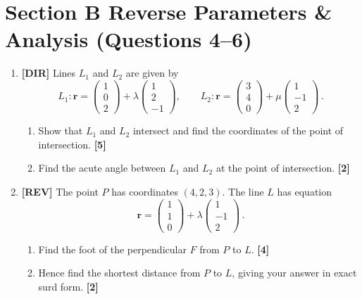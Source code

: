 \documentclass[11pt,a4paper]{article}
\begin{document}
\section*{Section B \quad Reverse Parameters \& Analysis \hfill{\normalfont\small(Questions 4--6)}}
\begin{enumerate}[resume]
\item \textbf{[DIR]} Lines $L_1$ and $L_2$ are given by
\[
L_1 : \mathbf{r} = \begin{pmatrix} 1 \\ 0 \\ 2 \end{pmatrix} + \lambda\begin{pmatrix} 1 \\ 2 \\ -1 \end{pmatrix},
\qquad
L_2 : \mathbf{r} = \begin{pmatrix} 3 \\ 4 \\ 0 \end{pmatrix} + \mu\begin{pmatrix} 1 \\ -1 \\ 2 \end{pmatrix}\,.
\]
\begin{enumerate}
  \item Show that $L_1$ and $L_2$ intersect and find the coordinates of the point of intersection. \hfill{\small\textbf{[5]}}
  \item Find the acute angle between $L_1$ and $L_2$ at the point of intersection. \hfill{\small\textbf{[2]}}
\end{enumerate}

\item \textbf{[REV]} The point $P$ has coordinates $(4, 2, 3)$. The line $L$ has equation
\[
\mathbf{r} = \begin{pmatrix} 1 \\ 1 \\ 0 \end{pmatrix} + \lambda\begin{pmatrix} 1 \\ -1 \\ 2 \end{pmatrix}\,.
\]
\begin{enumerate}
  \item Find the foot of the perpendicular $F$ from $P$ to $L$. \hfill{\small\textbf{[4]}}
  \item Hence find the shortest distance from $P$ to $L$, giving your answer in exact surd form. \hfill{\small\textbf{[2]}}
\end{enumerate}


\end{enumerate}
\end{document}
